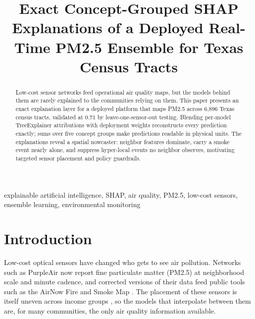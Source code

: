 \documentclass[conference]{IEEEtran}
\begin{document}
\title{Exact Concept-Grouped SHAP Explanations of a Deployed Real-Time
PM2.5 Ensemble for Texas Census Tracts}

\author{
\and
{}
\and
{}
}

\maketitle

\begin{abstract}
Low-cost sensor networks feed operational air quality maps, but the models
behind them are rarely explained to the communities relying on them. This
paper presents an exact explanation layer for a deployed platform that maps
PM2.5 across 6,896 Texas census tracts, validated at 0.71 by
leave-one-sensor-out testing. Blending per-model TreeExplainer attributions
with deployment weights reconstructs every prediction exactly; sums over
five concept groups make predictions readable in physical units. The
explanations reveal a spatial nowcaster: neighbor features dominate, carry
a smoke event nearly alone, and suppress hyper-local events no neighbor
observes, motivating targeted sensor placement and policy guardrails.
\end{abstract}

\begin{IEEEkeywords}
explainable artificial intelligence, SHAP, air quality, PM2.5, low-cost
sensors, ensemble learning, environmental monitoring
\end{IEEEkeywords}

\section{Introduction}
Low-cost optical sensors have changed who gets to see air pollution.
Networks such as PurpleAir now report fine particulate matter (PM2.5) at
neighborhood scale and minute cadence, and corrected versions of their data
feed public tools such as the AirNow Fire and Smoke Map
\cite{barkjohn2021}. The
placement of these sensors is itself uneven across income groups
\cite{desouza2021}, so the models that interpolate between them are, for
many communities, the only air quality information available.
\end{document}
